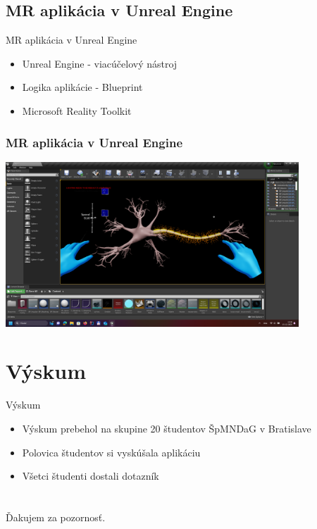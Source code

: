 \documentclass[pdf]{beamer}
\begin{document}
\subsection{MR aplikácia v Unreal Engine}
\begin{frame}{MR aplikácia v Unreal Engine}
    \begin{itemize}
        \item Unreal Engine - viacúčelový nástroj
        \item Logika aplikácie - Blueprint        
        \item Microsoft Reality Toolkit
    \end{itemize}
\end{frame}

\begin{frame}
    \frametitle{MR aplikácia v Unreal Engine}
    \begin{center}
        \includegraphics[width=11cm]{img/unreal.png}
    \end{center}
\end{frame}

\section{Výskum}
\begin{frame}{Výskum}
    \begin{itemize}
        \item Výskum prebehol na skupine 20 študentov ŠpMNDaG v Bratislave
        \item Polovica študentov si vyskúšala aplikáciu
        \item Všetci študenti dostali dotazník
    \end{itemize}    
\end{frame}

    

    

\section*{}
\begin{frame}{}
    Ďakujem za pozornosť.
\end{frame}
\end{document}
